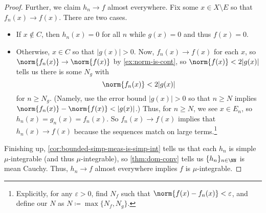 \documentclass[../notes.tex]{subfiles}
\begin{document}
\begin{proof}
	Further, we claim $h_n\to f$ almost everywhere. Fix some $x\in X\setminus E$ so that $f_n(x)\to f(x)$. There are two cases.
	\begin{itemize}
		\item If $x\notin C$, then $h_n(x)=0$ for all $n$ while $g(x)=0$ and thus $f(x)=0$.
		\item Otherwise, $x\in C$ so that $|g(x)|>0$. Now, $f_n(x)\to f(x)$ for each $x$, so $\norm{f_n(x)}\to\norm{f(x)}$ by \autoref{ex:norm-is-cont}, so $\norm{f(x)}<2|g(x)|$ tells us there is some $N_g$ with
		\[\norm{f_n(x)}<2|g(x)|\]
		for $n\ge N_g$. (Namely, use the error bound $|g(x)|>0$ so that $n\ge N$ implies $\norm{f_n(x)}-\norm{f(x)}<|g(x)|$.) Thus, for $n\ge N$, we see $x\in E_n$, so $h_n(x)=g_n(x)=f_n(x)$. So $f_n(x)\to f(x)$ implies that $h_n(x)\to f(x)$ because the sequences match on large terms.\footnote{Explicitly, for any $\varepsilon>0$, find $N_f$ such that $\norm{f(x)-f_n(x)}<\varepsilon$, and define our $N$ as $N\coloneqq\max\{N_f,N_g\}$.}
	\end{itemize}
	Finishing up, \autoref{cor:bounded-simp-meas-is-simp-int} tells us that each $h_n$ is simple $\mu$-integrable (and thus $\mu$-integrable), so \autoref{thm:dom-conv} tells us $\{h_n\}_{n\in\NN}$ is mean Cauchy. Thus, $h_n\to f$ almost everywhere implies $f$ is $\mu$-integrable.
\end{proof}
\end{document}
